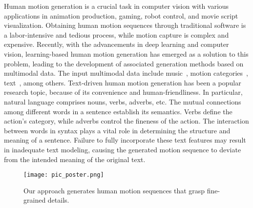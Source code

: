 \documentclass[10pt,twocolumn,letterpaper]{article}
\begin{document}
Human motion generation is a crucial task in computer vision with various applications in animation production, gaming, robot control, and movie script visualization. Obtaining human motion sequences through traditional software is a labor-intensive and tedious process, while motion capture is complex and expensive. Recently, with the advancements in deep learning and computer vision, learning-based human motion generation has emerged as a solution to this problem, leading to the development of associated generation methods based on multimodal data. The input multimodal data include music~\cite{kao2020temporally,li2021ai,ren2020self,starke2022deepphase}, motion categories~\cite{cervantes2022implicit,guo2020action2motion,petrovich2021action}, text~\cite{ahuja2019language2pose,bhattacharya2021text2gestures,ghosh2021synthesis,guo2022generating,guo2022tm2t,lin:vigil18,petrovich2022temos,plappert2018learning,tevet2022human,zhang2022motiondiffuse}, among others. Text-driven human motion generation has been a popular research topic, because of its convenience and human-friendliness. In particular, natural language comprises nouns, verbs, adverbs, etc. 
The mutual connections among different words in a sentence establish its semantics. Verbs define the action's category, while adverbs control the fineness of the action.
The interaction between words in syntax plays a vital role in determining the structure and meaning of a sentence. Failure to fully incorporate these text features may result in inadequate text modeling, causing the generated motion sequence to deviate from the intended meaning of the original text.
\begin{figure}[t]
  \centering
  \texttt{[image: pic\_poster.png]}
  \caption{Our approach generates human motion sequences that grasp fine-grained details.}
\label{fig:fpic}
\end{figure}
\end{document}
